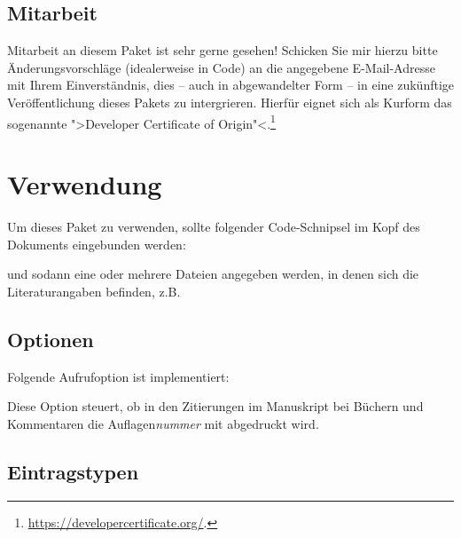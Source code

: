 \documentclass{ltxdockit}[2010/09/26]
\begin{document}
\subsection{Mitarbeit}

Mitarbeit an diesem Paket ist sehr gerne gesehen! Schicken Sie mir hierzu bitte Änderungsvorschläge (idealerweise in Code) an die angegebene E-Mail-Adresse mit Ihrem Einverständnis, dies -- auch in abgewandelter Form -- in eine zukünftige Veröffentlichung dieses Pakets zu intergrieren. Hierfür eignet sich als Kurform das sogenannte ">Developer Certificate of
Origin"<.\footnote{\url{https://developercertificate.org/}.}

\section{Verwendung}

Um dieses Paket zu verwenden, sollte folgender Code-Schnipsel im Kopf des Dokuments eingebunden werden:

\begin{ltxcode}
\usepackage[backend=biber,style=german-legal-book]{biblatex}
\end{ltxcode}

\noindent{}%
und sodann eine oder mehrere Dateien angegeben werden, in denen sich die Literaturangaben befinden, z.B.

\begin{ltxcode}



\end{ltxcode}

\subsection{Optionen}

Folgende Aufrufoption ist implementiert:

\begin{optionlist}


Diese Option steuert, ob in den Zitierungen im Manuskript bei Büchern und Kommentaren die Auflagen\textit{nummer} mit abgedruckt wird.

\end{optionlist}

\subsection{Eintragstypen}
\end{document}
